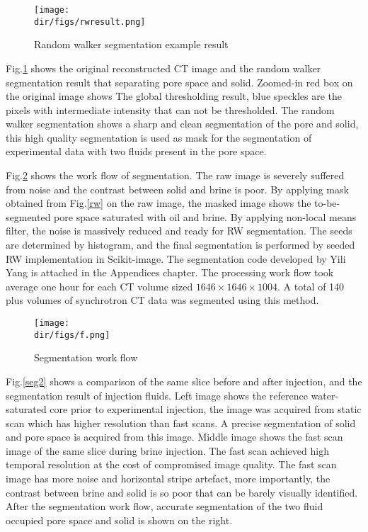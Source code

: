\begin{figure}[htbp]
  \centering
  \texttt{[image: \\dir/figs/rwresult.png]}
  \caption{Random walker segmentation example result}
  \label{rwresult}
\end{figure}

Fig.\ref{rwresult} shows the original reconstructed CT image and the random walker segmentation result that separating pore space and solid. Zoomed-in red box on the original image shows The global thresholding result, blue speckles are the pixels with intermediate intensity that can not be thresholded. The random walker segmentation shows a sharp and clean segmentation of the pore and solid, this high quality segmentation is used as mask for the segmentation of experimental data with two fluids present in the pore space.

Fig.\ref{segworkflow} shows the work flow of segmentation. The raw image is severely suffered from noise and the contrast between solid and brine is poor. By applying mask obtained from Fig.\ref{rw} on the raw image, the masked image shows the to-be-segmented pore space saturated with oil and brine. By applying non-local means filter, the noise is massively reduced and ready for RW segmentation. The seeds are determined by histogram, and the final segmentation is performed by seeded RW implementation in Scikit-image. The segmentation code developed by Yili Yang is attached in the Appendices chapter. The processing work flow took average one hour for each CT volume sized $1646 \times 1646 \times 1004$. A total of 140 plus volumes of synchrotron CT data was segmented using this method.

\begin{figure}[htbp]
  \centering
  \texttt{[image: \\dir/figs/f.png]}
  \caption{Segmentation work flow}
  \label{segworkflow}
\end{figure}

Fig.\ref{seg2} shows a comparison of the same slice before and after injection, and the segmentation result of injection fluids. Left image shows the reference water-saturated core prior to experimental injection, the image was acquired from static scan which has higher resolution than fast scans. A precise segmentation of solid and pore space is acquired from this image. Middle image shows the fast scan image of the same slice during brine injection. The fast scan achieved high temporal resolution at the cost of compromised image quality. The fast scan image has more noise and horizontal stripe artefact, more importantly, the contrast between brine and solid is so poor that can be barely visually identified. After the segmentation work flow, accurate segmentation of the two fluid occupied pore space and solid is shown on the right. 


